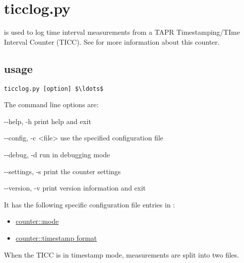 \section{ticclog.py}
\hypertarget{h:ticclog}{}

 is used to log time interval measurements from a TAPR Timestamping/TIme Interval Counter (TICC).
See  for more information about this counter.

\subsection{usage}

\begin{lstlisting}[mathescape=true]
ticclog.py [option] $\ldots$ 
\end{lstlisting}

The command line options are:
\begin{description*}
 \item[-{}-help, -h] print help and exit
 \item[-{}-config, -c  \textless{file}\textgreater] use the specified configuration file
 \item[-{}-debug, -d]           run in debugging mode
 \item[-{}-settings, -s]        print the counter settings
  \item[-{}-version, -v]        print version information and exit
\end{description*}

It has the following specific configuration file entries in :
\begin{itemize}
	\item \hyperlink{h:counter_mode}{counter::mode}
	\item \hyperlink{h:counter_timestamp_format}{counter::timestamp format}
\end{itemize}

When the TICC is in timestamp mode, measurements are split into two files.
